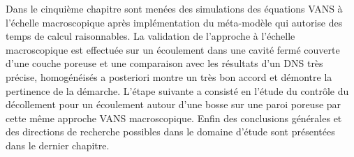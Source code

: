 Dans le cinquième chapitre sont menées des simulations des équations VANS à l’échelle macroscopique après implémentation du méta-modèle qui autorise des temps de calcul raisonnables.  La validation de l’approche à l’échelle macroscopique est effectuée sur un écoulement dans une cavité fermé couverte d’une couche poreuse et une comparaison avec les résultats d’un DNS très précise, homogénéisés a posteriori montre un très bon accord et démontre la pertinence de la démarche. L’étape suivante a consisté en l’étude du contrôle du décollement pour un écoulement autour d’une bosse sur une paroi poreuse par cette même approche VANS macroscopique. Enfin des conclusions générales et des directions de recherche possibles dans le domaine d’étude sont présentées dans le dernier chapitre.